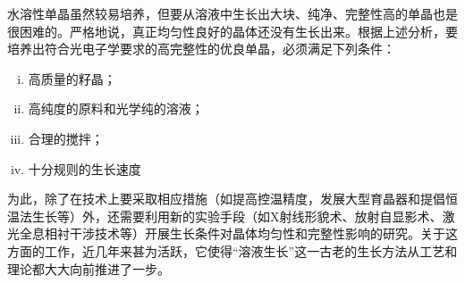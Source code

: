 水溶性单晶虽然较易培养，但要从溶液中生长出大块、纯净、完整性高的单晶也是很困难的。严格地说，真正均匀性良好的晶体还没有生长出来。根据上述分析，要培养出符合光电子学要求的高完整性的优良单晶，必须满足下列条件：
\begin{enumerate}[(i)]\itemsep -0.5ex
\item 高质量的籽晶；
\item 高纯度的原料和光学纯的溶液；
\item 合理的搅拌；
\item 十分规则的生长速度
\end{enumerate}
\noindent 为此，除了在技术上要采取相应措施（如提高控温精度，发展大型育晶器和提倡恒温法生长等）外，还需要利用新的实验手段（如X射线形貌术、放射自显影术、激光全息相衬干涉技术等）开展生长条件对晶体均匀性和完整性影响的研究。关于这方面的工作，近几年来甚为活跃，它使得“溶液生长”这一古老的生长方法从工艺和理论都大大向前推进了一步。

